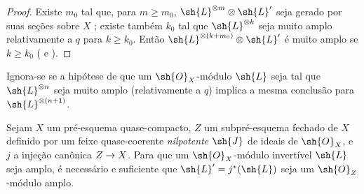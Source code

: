 \documentclass[oneside,10pt]{amsart}
\makeatletter
\renewcommand{\geq}{\geqslant}
\newcommand{\ega@arrow}[2]{\mathchoice{#1}{#2}{#2}{#2}}
\renewcommand{\to}{\ega@arrow{\longrightarrow}{\rightarrow}}
\let\EGAOriginalLabel\label
\renewcommand{\label}[1]{\phantomsection\EGAOriginalLabel{#1}}
\makeatother
\begin{document}
\begin{proof}
Existe $m_0$ tal que, para $m\geq m_0$, $\sh{L}^{\otimes m}\otimes\sh{L}'$ seja gerado por suas seções sobre $X$ ;
existe também $k_0$ tal que $\sh{L}^{\otimes k}$ seja muito amplo relativamente a $q$ para $k\geq k_0$.
Então $\sh{L}^{\otimes(k+m_0)}\otimes\sh{L}'$ é muito amplo se $k\geq k_0$ ( e ).
\end{proof}

\begin{remark}[4.5.12]
\label{II.4.5.12}
Ignora-se se a hipótese de que um $\sh{O}_X$-módulo $\sh{L}$ seja tal que $\sh{L}^{\otimes n}$ seja muito amplo (relativamente a $q$) implica a mesma conclusão para $\sh{L}^{\otimes(n+1)}$.
\end{remark}

\begin{proposition}[4.5.13]
\label{II.4.5.13}
Sejam $X$ um pré-esquema quase-compacto, $Z$ um subpré-esquema fechado de $X$ definido por um feixe quase-coerente \emph{nilpotente} $\sh{J}$ de ideais de $\sh{O}_X$, e $j$ a injeção canônica $Z\to X$.
Para que um $\sh{O}_X$-módulo invertível $\sh{L}$ seja amplo, é necessário e suficiente que $\sh{L}'=j^*(\sh{L})$ seja um $\sh{O}_Z$-módulo amplo.
\end{proposition}
\end{document}

